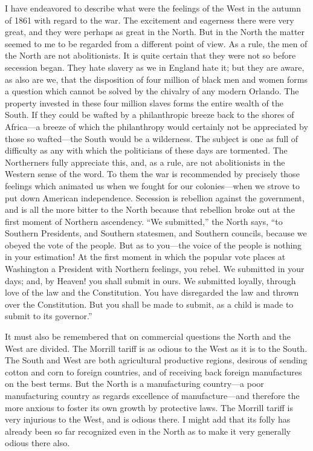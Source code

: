 I have endeavored to describe what were the feelings of the West in
the autumn of 1861 with regard to the war.  The excitement and
eagerness there were very great, and they were perhaps as great in
the North.  But in the North the matter seemed to me to be regarded
from a different point of view.  As a rule, the men of the North
are not abolitionists.  It is quite certain that they were not so
before secession began.  They hate slavery as we in England hate
it; but they are aware, as also are we, that the disposition of
four million of black men and women forms a question which cannot
be solved by the chivalry of any modern Orlando.  The property
invested in these four million slaves forms the entire wealth of
the South.  If they could be wafted by a philanthropic breeze back
to the shores of Africa---a breeze of which the philanthropy would
certainly not be appreciated by those so wafted---the South would be
a wilderness.  The subject is one as full of difficulty as any with
which the politicians of these days are tormented.  The Northerners
fully appreciate this, and, as a rule, are not abolitionists in the
Western sense of the word.  To them the war is recommended by
precisely those feelings which animated us when we fought for our
colonies---when we strove to put down American independence.
Secession is rebellion against the government, and is all the more
bitter to the North because that rebellion broke out at the first
moment of Northern ascendency.  ``We submitted,'' the North says, ``to
Southern Presidents, and Southern statesmen, and Southern councils,
because we obeyed the vote of the people.  But as to you---the voice
of the people is nothing in your estimation!  At the first moment
in which the popular vote places at Washington a President with
Northern feelings, you rebel.  We submitted in your days; and, by
Heaven! you shall submit in ours.  We submitted loyally, through
love of the law and the Constitution.  You have disregarded the law
and thrown over the Constitution.  But you shall be made to submit,
as a child is made to submit to its governor.''

It must also be remembered that on commercial questions the North
and the West are divided.  The Morrill tariff is as odious to the
West as it is to the South.  The South and West are both
agricultural productive regions, desirous of sending cotton and
corn to foreign countries, and of receiving back foreign
manufactures on the best terms.  But the North is a manufacturing
country---a poor manufacturing country as regards excellence of
manufacture---and therefore the more anxious to foster its own
growth by protective laws.  The Morrill tariff is very injurious to
the West, and is odious there.  I might add that its folly has
already been so far recognized even in the North as to make it very
generally odious there also.

